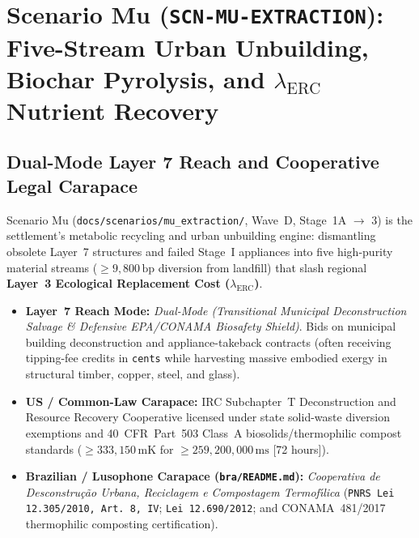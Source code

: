 \chapter{Scenario Mu (\texttt{SCN-MU-EXTRACTION}): Five-Stream Urban Unbuilding, Biochar Pyrolysis, and \texorpdfstring{$\lambda_{\mathrm{ERC}}$}{lambda\_ERC} Nutrient Recovery}
\label{app:scenario-mu}

\section{Dual-Mode Layer 7 Reach and Cooperative Legal Carapace}
Scenario Mu (\texttt{docs/scenarios/mu\_extraction/}, Wave~D, Stage~1A $\to$ 3) is the settlement's metabolic recycling and urban unbuilding engine: dismantling obsolete Layer~7 structures and failed Stage~I appliances into five high-purity material streams ($\ge 9{,}800\,\mathrm{bp}$ diversion from landfill) that slash regional \textbf{Layer~3 Ecological Replacement Cost ($\lambda_{\mathrm{ERC}}$)}.
\begin{itemize}
    \item \textbf{Layer~7 Reach Mode:} \textit{Dual-Mode (Transitional Municipal Deconstruction Salvage \& Defensive EPA/CONAMA Biosafety Shield)}. Bids on municipal building deconstruction and appliance-takeback contracts (often receiving tipping-fee credits in \texttt{cents} while harvesting massive embodied exergy in structural timber, copper, steel, and glass).
    \item \textbf{US / Common-Law Carapace:} IRC Subchapter~T Deconstruction and Resource Recovery Cooperative licensed under state solid-waste diversion exemptions and 40~CFR~Part~503 Class~A biosolids/thermophilic compost standards ($\ge 333{,}150\,\mathrm{mK}$ for $\ge 259{,}200{,}000\,\mathrm{ms}$ [72 hours]).
    \item \textbf{Brazilian / Lusophone Carapace (\texttt{bra/README.md}):} \textit{Cooperativa de Desconstru{\c{c}}{\~a}o Urbana, Reciclagem e Compostagem Termof{\'\i}lica} (\texttt{PNRS Lei 12.305/2010, Art.~8{\textordmasculine}, IV}; \texttt{Lei 12.690/2012}; and CONAMA~481/2017 thermophilic composting certification).
\end{itemize}

